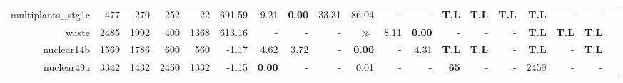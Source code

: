 \begin{table*}[t]
\begin{tabular}{|r|r|r|r|r||r||r|r|r|r|r|r||r|r|r|r|r|r|r|}
         multiplants\_stg1c &          477 &          270 &          252 &           22 &              691.59 &           9.21 &  \textbf{0.00} &          33.31 &          86.04 &              - &              - & \textbf{T.L} & \textbf{T.L} &       \textbf{T.L} &       \textbf{T.L} &           - &           - \\ 
                      waste &         2485 &         1992 &          400 &         1368 &              613.16 &              - &              - &              - &          $\gg$ &           8.11 &  \textbf{0.00} &            - &            - &                  - &       \textbf{T.L} &\textbf{T.L} &\textbf{T.L} \\ 
                 nuclear14b &         1569 &         1786 &          600 &          560 &               -1.17 &           4.62 &           3.72 &              - &  \textbf{0.00} &              - &           4.31 & \textbf{T.L} & \textbf{T.L} &                  - &       \textbf{T.L} &           - &\textbf{T.L} \\ 
                 nuclear49a &         3342 &         1432 &         2450 &         1332 &               -1.15 &  \textbf{0.00} &              - &              - &           0.01 &              - &              - &  \textbf{65} &            - &                  - &               2459 &           - &           - \\ 
\hline 
\end{tabular}\\ 
\label{table:results} 
\end{table*} 
